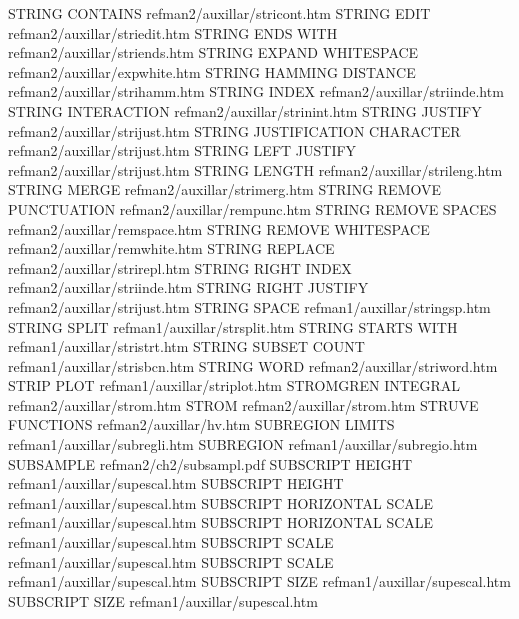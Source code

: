 STRING CONTAINS                         refman2/auxillar/stricont.htm
STRING EDIT                             refman2/auxillar/striedit.htm
STRING ENDS WITH                        refman2/auxillar/striends.htm
STRING EXPAND WHITESPACE                refman2/auxillar/expwhite.htm
STRING HAMMING DISTANCE                 refman2/auxillar/strihamm.htm
STRING INDEX                            refman2/auxillar/striinde.htm
STRING INTERACTION                      refman2/auxillar/strinint.htm
STRING JUSTIFY                          refman2/auxillar/strijust.htm
STRING JUSTIFICATION CHARACTER          refman2/auxillar/strijust.htm
STRING LEFT JUSTIFY                     refman2/auxillar/strijust.htm
STRING LENGTH                           refman2/auxillar/strileng.htm
STRING MERGE                            refman2/auxillar/strimerg.htm
STRING REMOVE PUNCTUATION               refman2/auxillar/rempunc.htm
STRING REMOVE SPACES                    refman2/auxillar/remspace.htm
STRING REMOVE WHITESPACE                refman2/auxillar/remwhite.htm
STRING REPLACE                          refman2/auxillar/strirepl.htm
STRING RIGHT INDEX                      refman2/auxillar/striinde.htm
STRING RIGHT JUSTIFY                    refman2/auxillar/strijust.htm
STRING SPACE                            refman1/auxillar/stringsp.htm
STRING SPLIT                            refman1/auxillar/strsplit.htm
STRING STARTS WITH                      refman1/auxillar/stristrt.htm
STRING SUBSET COUNT                     refman1/auxillar/strisbcn.htm
STRING WORD                             refman2/auxillar/striword.htm
STRIP PLOT                              refman1/auxillar/striplot.htm
STROMGREN INTEGRAL                      refman2/auxillar/strom.htm
STROM                                   refman2/auxillar/strom.htm
STRUVE FUNCTIONS                        refman2/auxillar/hv.htm
SUBREGION LIMITS                        refman1/auxillar/subregli.htm
SUBREGION                               refman1/auxillar/subregio.htm
SUBSAMPLE                               refman2/ch2/subsampl.pdf
SUBSCRIPT HEIGHT                        refman1/auxillar/supescal.htm
SUBSCRIPT HEIGHT                        refman1/auxillar/supescal.htm
SUBSCRIPT HORIZONTAL SCALE              refman1/auxillar/supescal.htm
SUBSCRIPT HORIZONTAL SCALE              refman1/auxillar/supescal.htm
SUBSCRIPT SCALE                         refman1/auxillar/supescal.htm
SUBSCRIPT SCALE                         refman1/auxillar/supescal.htm
SUBSCRIPT SIZE                          refman1/auxillar/supescal.htm
SUBSCRIPT SIZE                          refman1/auxillar/supescal.htm
